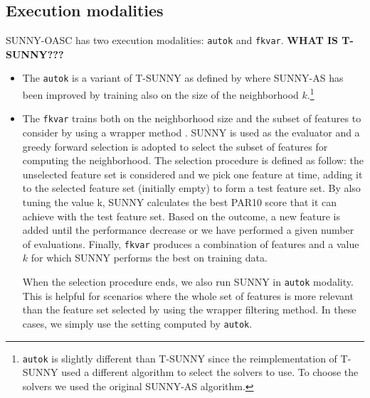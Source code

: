 \documentclass[tablecaption=bottom,wcp]{jmlr} %
\begin{document}


\subsection{Execution modalities}

SUNNY-OASC has two execution modalities: \texttt{autok} and 
\texttt{fkvar}. \textbf{WHAT IS T-SUNNY???}

\begin{itemize}
  \item The \texttt{autok} is a variant of T-SUNNY as defined by 
\cite{DBLP:conf/lion/LindauerBH16} where SUNNY-AS has been improved by training 
also on the size of the neighborhood 
$k$.\footnote{\texttt{autok} is slightly different than T-SUNNY since the 
reimplementation of T-SUNNY used a different algorithm to select the 
solvers to use. To choose the solvers we used the original SUNNY-AS 
algorithm.}
  \item The \texttt{fkvar} trains both on the neighborhood size and 
the subset of features to consider by using a wrapper method 
\citep{Kohavi97wrappersfor}. SUNNY is used as the evaluator and a 
greedy forward selection is adopted to select the subset of features for 
computing the neighborhood.
% 
The selection procedure is defined as follow: 
the unselected feature set is considered and we pick one feature at time, 
adding it to the selected feature set (initially empty) to form a test 
feature set. By also tuning the value k, SUNNY calculates the best PAR10 score 
that it can achieve with the test feature set. Based on the outcome, a new 
feature is added until the performance decrease or we have performed a given 
number of evaluations. Finally, \texttt{fkvar} 
produces a combination of features and a value $k$ for which SUNNY performs the 
best on training data.

When the selection procedure ends, we also run SUNNY in %
\texttt{autok} modality. This is helpful
for scenarios where the whole set of features is more relevant than the 
feature set selected by using the wrapper filtering method. 
In these cases, we simply use the setting computed by \texttt{autok}.
\end{itemize}
 
\end{document}
